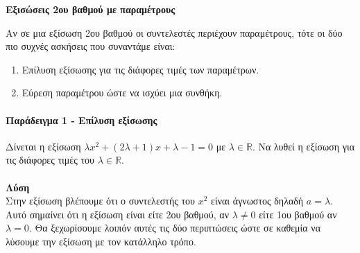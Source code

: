 \documentclass[11pt,a4paper]{article}
\begin{document}
\begin{center}
{\Large \textbf{Εξισώσεις 2ου βαθμού με παραμέτρους}}
\end{center}
Αν σε μια εξίσωση 2ου βαθμού οι συντελεστές περιέχουν παραμέτρους, τότε οι δύο πιο συχνές ασκήσεις που συναντάμε είναι:
\begin{enumerate}
\item Επίλυση εξίσωσης για τις διάφορες τιμές των παραμέτρων.
\item Εύρεση παραμέτρου ώστε να ισχύει μια συνθήκη.
\end{enumerate}
\paragraph{Παράδειγμα 1 - Επίλυση εξίσωσης}
Δίνεται η εξίσωση $ \lambda x^2+(2\lambda+1)x+\lambda-1=0 $ με $ \lambda\in\mathbb{R} $. Να λυθεί η εξίσωση για τις διάφορες τιμές του $ \lambda\in\mathbb{R} $.\\\\
\textbf{Λύση}\\
Στην εξίσωση βλέπουμε ότι ο συντελεστής του $ x^2 $ είναι άγνωστος δηλαδή $ a=\lambda $. Αυτό σημαίνει ότι η εξίσωση είναι είτε 2ου βαθμού, αν $ \lambda\neq 0 $ είτε 1ου βαθμού αν $ \lambda=0 $. Θα ξεχωρίσουμε λοιπόν αυτές τις δύο περιπτώσεις ώστε σε καθεμία να λύσουμε την εξίσωση με τον κατάλληλο τρόπο.
\end{document}

